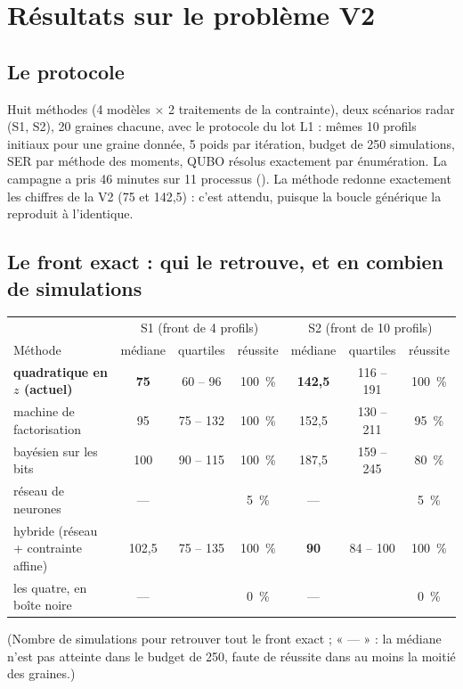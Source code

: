 \chapter{Résultats sur le problème V2}\label{ch:resultats-v2}

\section{Le protocole}
Huit méthodes (4 modèles $\times$ 2 traitements de la contrainte), deux scénarios radar (S1, S2), 20 graines chacune, avec le protocole du lot L1 : mêmes 10 profils initiaux pour une graine donnée, 5 poids par itération, budget de 250 simulations, SER par méthode des moments, QUBO résolus exactement par énumération. La campagne a pris 46 minutes sur 11 processus (). La méthode  redonne exactement les chiffres de la V2 (75 et 142,5) : c'est attendu, puisque la boucle générique la reproduit à l'identique.

\section{Le front exact : qui le retrouve, et en combien de simulations}
\begin{center}
\renewcommand{\arraystretch}{1.2}
\small
\begin{tabular}{lcccccc}
\toprule
& \multicolumn{3}{c}{S1 (front de 4 profils)} & \multicolumn{3}{c}{S2 (front de 10 profils)} \\
Méthode & médiane & quartiles & réussite & médiane & quartiles & réussite \\
\midrule
\textbf{quadratique en $z$ (actuel)} & \textbf{75} & 60 -- 96 & 100~\% & \textbf{142,5} & 116 -- 191 & 100~\% \\
machine de factorisation & 95 & 75 -- 132 & 100~\% & 152,5 & 130 -- 211 & 95~\% \\
bayésien sur les bits & 100 & 90 -- 115 & 100~\% & 187,5 & 159 -- 245 & 80~\% \\
réseau de neurones & --- & & 5~\% & --- & & 5~\% \\
\midrule
hybride (réseau + contrainte affine) & 102,5 & 75 -- 135 & 100~\% & \textbf{90} & 84 -- 100 & 100~\% \\
\midrule
les quatre, en boîte noire & --- & & 0~\% & --- & & 0~\% \\
\bottomrule
\end{tabular}
\end{center}
(Nombre de simulations pour retrouver tout le front exact ; « --- » : la médiane n'est pas atteinte dans le budget de 250, faute de réussite dans au moins la moitié des graines.)

